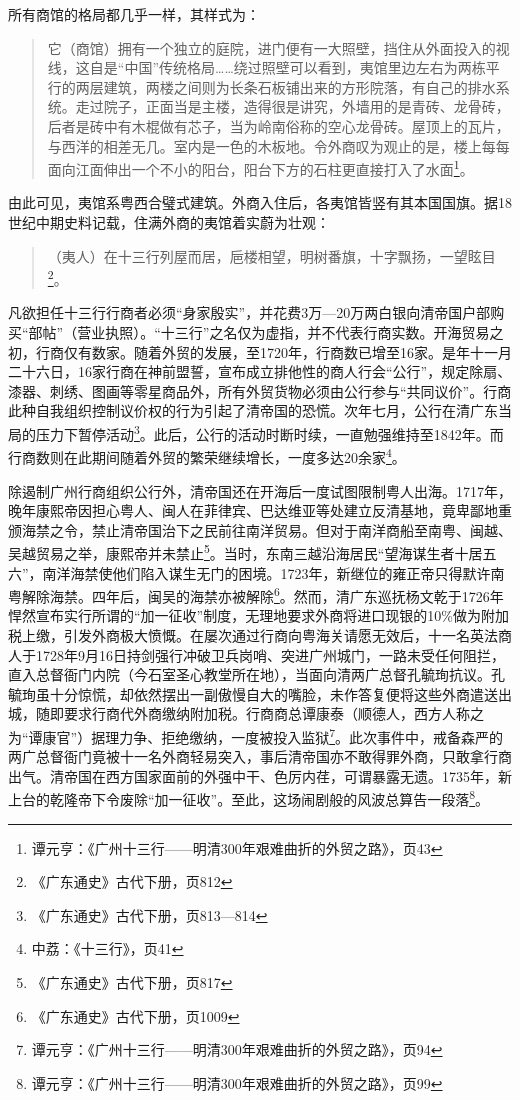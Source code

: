 所有商馆的格局都几乎一样，其样式为：

\begin{quote}

它（商馆）拥有一个独立的庭院，进门便有一大照壁，挡住从外面投入的视线，这自是“中国”传统格局……绕过照壁可以看到，夷馆里边左右为两栋平行的两层建筑，两楼之间则为长条石板铺出来的方形院落，有自己的排水系统。走过院子，正面当是主楼，造得很是讲究，外墙用的是青砖、龙骨砖，后者是砖中有木棍做有芯子，当为岭南俗称的空心龙骨砖。屋顶上的瓦片，与西洋的相差无几。室内是一色的木板地。令外商叹为观止的是，楼上每每面向江面伸出一个不小的阳台，阳台下方的石柱更直接打入了水面\footnote{谭元亨：《广州十三行——明清300年艰难曲折的外贸之路》，页43}。

\end{quote}


由此可见，夷馆系粤西合璧式建筑。外商入住后，各夷馆皆竖有其本国国旗。据18世纪中期史料记载，住满外商的夷馆着实蔚为壮观：

\begin{quote}
（夷人）在十三行列屋而居，巵楼相望，明树番旗，十字飘扬，一望眩目\footnote{《广东通史》古代下册，页812}。

\end{quote}

凡欲担任十三行行商者必须“身家殷实”，并花费3万—20万两白银向清帝国户部购买“部帖”（营业执照）。“十三行”之名仅为虚指，并不代表行商实数。开海贸易之初，行商仅有数家。随着外贸的发展，至1720年，行商数已增至16家。是年十一月二十六日，16家行商在神前盟誓，宣布成立排他性的商人行会“公行”，规定除扇、漆器、刺绣、图画等零星商品外，所有外贸货物必须由公行参与“共同议价”。行商此种自我组织控制议价权的行为引起了清帝国的恐慌。次年七月，公行在清广东当局的压力下暂停活动\footnote{《广东通史》古代下册，页813—814}。此后，公行的活动时断时续，一直勉强维持至1842年。而行商数则在此期间随着外贸的繁荣继续增长，一度多达20余家\footnote{中荔：《十三行》，页41}。

除遏制广州行商组织公行外，清帝国还在开海后一度试图限制粤人出海。1717年，晚年康熙帝因担心粤人、闽人在菲律宾、巴达维亚等处建立反清基地，竟卑鄙地重颁海禁之令，禁止清帝国治下之民前往南洋贸易。但对于南洋商船至南粤、闽越、吴越贸易之举，康熙帝并未禁止\footnote{《广东通史》古代下册，页817}。当时，东南三越沿海居民“望海谋生者十居五六”，南洋海禁使他们陷入谋生无门的困境。1723年，新继位的雍正帝只得默许南粤解除海禁。四年后，闽吴的海禁亦被解除\footnote{《广东通史》古代下册，页1009}。然而，清广东巡抚杨文乾于1726年悍然宣布实行所谓的“加一征收”制度，无理地要求外商将进口现银的10\%做为附加税上缴，引发外商极大愤慨。在屡次通过行商向粤海关请愿无效后，十一名英法商人于1728年9月16日持剑强行冲破卫兵岗哨、突进广州城门，一路未受任何阻拦，直入总督衙门内院（今石室圣心教堂所在地），当面向清两广总督孔毓珣抗议。孔毓珣虽十分惊慌，却依然摆出一副傲慢自大的嘴脸，未作答复便将这些外商遣送出城，随即要求行商代外商缴纳附加税。行商商总谭康泰（顺德人，西方人称之为“谭康官”）据理力争、拒绝缴纳，一度被投入监狱\footnote{谭元亨：《广州十三行——明清300年艰难曲折的外贸之路》，页94}。此次事件中，戒备森严的两广总督衙门竟被十一名外商轻易突入，事后清帝国亦不敢得罪外商，只敢拿行商出气。清帝国在西方国家面前的外强中干、色厉内荏，可谓暴露无遗。1735年，新上台的乾隆帝下令废除“加一征收”。至此，这场闹剧般的风波总算告一段落\footnote{谭元亨：《广州十三行——明清300年艰难曲折的外贸之路》，页99}。

